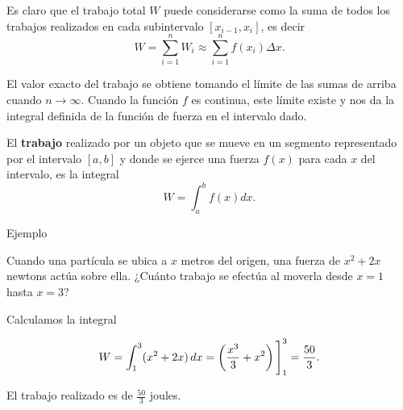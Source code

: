 \documentclass[
  letterpaper,
]{book}
\theoremstyle{plain}
\theoremstyle{remark}
\begin{document}
Es claro que el trabajo total \(W\) puede considerarse como la suma de
todos los trabajos realizados en cada subintervalo \([x_{i-1},x_{i}]\),
es decir \[
W = \sum_{i=1}^{n} W_i \approx \sum_{i=1}^{n} f(x_i)\Delta x.
\]

El valor exacto del trabajo se obtiene tomando el límite de las sumas de
arriba cuando \(n\to\infty\). Cuando la función \(f\) es continua, este
límite existe y nos da la integral definida de la función de fuerza en
el intervalo dado.

\begin{tcolorbox}[enhanced jigsaw, opacityback=0, left=2mm, opacitybacktitle=0.6, toprule=.15mm, bottomrule=.15mm, colbacktitle=quarto-callout-note-color!10!white, titlerule=0mm, bottomtitle=1mm, title=\textcolor{quarto-callout-note-color}{\faInfo}\hspace{0.5em}{Definición (Trabajo)}, toptitle=1mm, colframe=quarto-callout-note-color-frame, colback=white, breakable, rightrule=.15mm, arc=.35mm, leftrule=.75mm, coltitle=black]

El \textbf{trabajo} realizado por un objeto que se mueve en un segmento
representado por el intervalo \([a,b]\) y donde se ejerce una fuerza
\(f(x)\) para cada \(x\) del intervalo, es la integral \[
W = \int_a^b f(x)dx.
\]

\end{tcolorbox}

Ejemplo

Cuando una partícula se ubica a \(x\) metros del origen, una fuerza de
\(x^2+2x\) newtons actúa sobre ella. ¿Cuánto trabajo se efectúa al
moverla desde \(x=1\) hasta \(x=3\)?

\begin{tcolorbox}[enhanced jigsaw, opacityback=0, left=2mm, opacitybacktitle=0.6, toprule=.15mm, bottomrule=.15mm, colbacktitle=quarto-callout-tip-color!10!white, titlerule=0mm, bottomtitle=1mm, title=\textcolor{quarto-callout-tip-color}{\faLightbulb}\hspace{0.5em}{Solución}, toptitle=1mm, colframe=quarto-callout-tip-color-frame, colback=white, breakable, rightrule=.15mm, arc=.35mm, leftrule=.75mm, coltitle=black]

Calculamos la integral

\[
W = \int_1^3 (x^2+2x)\,dx = \left(\frac{x^3}{3} + x^2\right)\Bigg{]}_1^3 = \frac{50}{3}.
\]

El trabajo realizado es de \(\displaystyle \frac{50}{3}\) joules.

\end{tcolorbox}
\end{document}
